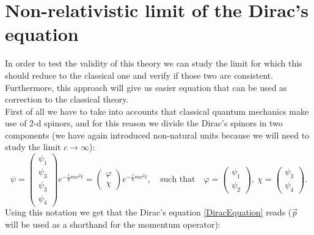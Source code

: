 \section{Non-relativistic limit of the Dirac's equation}
In order to test the validity of this theory we can study the limit for which this should reduce to the classical one and verify if those two are consistent. Furthermore, this approach will give us easier equation that can be used as correction to the classical theory.\\

First of all we have to take into accounts that classical quantum mechanics make use of 2-d spinors, and for this reason we divide the Dirac's spinors in two components (we have again introduced non-natural units because we will need to study the limit $c\rightarrow\infty$):
\begin{equation*}
    \psi=\begin{pmatrix}
        \psi_1\\\psi_3\\\psi_3\\\psi_4
    \end{pmatrix}e^{-\frac{i}{\hslash}mc^2t}
    =\begin{pmatrix}
        \varphi\\\chi
    \end{pmatrix}e^{-\frac{i}{\hslash}mc^2t},\quad \text{such that}\quad
    \varphi=\begin{pmatrix}
        \psi_1\\\psi_2
    \end{pmatrix},\ 
    \chi=\begin{pmatrix}
        \psi_3\\\psi_4
    \end{pmatrix}.
\end{equation*}
Using this notation we get that the Dirac's equation \eqref{DiracEquation} reads ($\vec p$ will be used as a shorthand for the momentum operator):
